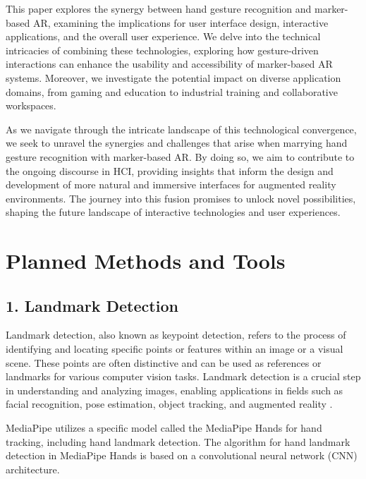 \documentclass[journal]{IEEEtran}
\begin{document}
This paper explores the synergy between hand gesture recognition and marker-based AR, examining the implications for user interface 
design, interactive applications, and the overall user experience. We delve into the technical intricacies of combining these 
technologies, exploring how gesture-driven interactions can enhance the usability and accessibility of marker-based AR systems. 
Moreover, we investigate the potential impact on diverse application domains, from gaming and education to industrial training and 
collaborative workspaces.

As we navigate through the intricate landscape of this technological convergence, we seek to unravel the synergies and challenges 
that arise when marrying hand gesture recognition with marker-based AR. By doing so, we aim to contribute to the ongoing discourse 
in HCI, providing insights that inform the design and development of more natural and immersive interfaces for augmented reality environments. 
The journey into this fusion promises to unlock novel possibilities, shaping the future landscape of interactive technologies and user experiences.










\section{Planned Methods and Tools}


\subsection*{1. Landmark Detection}
Landmark detection, also known as keypoint detection, refers to the process of identifying and locating specific points or 
features within an image or a visual scene. These points are often distinctive and can be used as references or landmarks 
for various computer vision tasks. Landmark detection \cite{handsegmentation2023} is a crucial step in understanding and analyzing images, enabling applications 
in fields such as facial recognition, pose estimation, object tracking, and augmented reality \cite{lin2021ego2hands}.

MediaPipe utilizes a specific model called the MediaPipe Hands for hand tracking, including hand landmark detection. 
The algorithm for hand landmark detection in MediaPipe Hands is based on a convolutional neural network (CNN) architecture.
\end{document}
